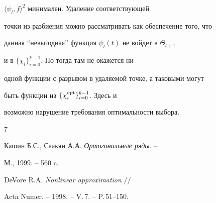 $\langle\psi_l,f\rangle^2$ минимален. Удаление соответствующей


точки из разбиения можно рассматривать как обеспечение того, что


данная ``невыгодная'' функция $\psi_l(t) $ не войдет в $\Theta_{l+1}$


и в $\{\chi_{i}\}_{i=0}^{k-1}$. Но тогда там не окажется ни


одной функции с разрывом в удаляемой точке, а таковыми могут


быть функции из $\{\chi_{i}^{\operatorname{opt}}\}_{i=0}^{k-1}$. Здесь и


возможно нарушение требования оптимальности выбора.








\begin{thebibliography}{7}







Кашин Б.С., Саакян А.А. {\em Ортогональные ряды}. --


М., 1999. -- 560 c.




DeVore R.A. {\em Nonlinear approximation} //


Acta Numer. -- 1998. -- V.\,7. -- P.\,51--150.





\end{thebibliography}





\vskip 2cm












\label{end}





